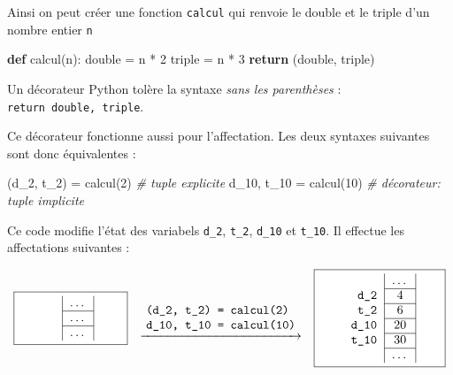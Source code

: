 \documentclass[a4paper,17pt]{extarticle}
\newenvironment{Shaded}{}{}
\newcommand{\KeywordTok}[1]{\textcolor[rgb]{0.00,0.44,0.13}{\textbf{{#1}}}}
\newcommand{\DecValTok}[1]{\textcolor[rgb]{0.25,0.63,0.44}{{#1}}}
\newcommand{\CommentTok}[1]{\textcolor[rgb]{0.38,0.63,0.69}{\textit{{#1}}}}
\newcommand{\NormalTok}[1]{{#1}}
\newcommand{\ControlFlowTok}[1]{\textcolor[rgb]{0.00,0.44,0.13}{\textbf{{#1}}}}
\newcommand{\OperatorTok}[1]{\textcolor[rgb]{0.40,0.40,0.40}{{#1}}}
\begin{document}
\begin{exemple}
    Ainsi on peut créer une fonction \texttt{calcul} qui renvoie le double
et le triple d'un nombre entier \texttt{n}

\begin{Shaded}
\begin{Highlighting}[]
\KeywordTok{def}\NormalTok{ calcul(n):}
\NormalTok{    double }\OperatorTok{=}\NormalTok{ n }\OperatorTok{*} \DecValTok{2}
\NormalTok{    triple }\OperatorTok{=}\NormalTok{ n }\OperatorTok{*} \DecValTok{3}
    \ControlFlowTok{return}\NormalTok{ (double, triple)}
\end{Highlighting}
\end{Shaded}

        \end{exemple}\begin{remarque}
    Un décorateur Python tolère la syntaxe \emph{sans les parenthèses} :
\texttt{return\ double,\ triple}.

Ce décorateur fonctionne aussi pour l'affectation. Les deux syntaxes
suivantes sont donc équivalentes :

\begin{Shaded}
\begin{Highlighting}[]
\NormalTok{(d\_2, t\_2) }\OperatorTok{=}\NormalTok{ calcul(}\DecValTok{2}\NormalTok{)   }\CommentTok{\# tuple explicite}
\NormalTok{d\_10, t\_10 }\OperatorTok{=}\NormalTok{ calcul(}\DecValTok{10}\NormalTok{)  }\CommentTok{\# décorateur: tuple implicite}
\end{Highlighting}
\end{Shaded}

Ce code modifie l'état des variabels \texttt{d\_2}, \texttt{t\_2},
\texttt{d\_10} et \texttt{t\_10}. Il effectue les affectations suivantes
:

\[
\fcolorbox{black}{white}{\parbox{3cm}{\centering
    \begin{tabular}{r|c|}
    & \ldots \\ \cline{2-2}
    & \ldots \\ \cline{2-2}
    & \ldots 
    \end{tabular}
}}
\hfill
\quad\underrightarrow{
    \begin{array}{l}
    \texttt{(d\_2, t\_2) = calcul(2)} \\
    \texttt{d\_10, t\_10 = calcul(10)}\\
    \end{array}
    }\quad
\hfill
\fcolorbox{black}{white}{\parbox{3.5cm}{\centering
    \begin{tabular}{r|c|}
    & \ldots \\ \cline{2-2}
    \texttt{d\_2} & $4$ \\ \cline{2-2}
    \texttt{t\_2} & $6$ \\ \cline{2-2}
    \texttt{d\_10} & $20$ \\ \cline{2-2}
    \texttt{t\_10} & $30$ \\ \cline{2-2}
    & \ldots 
    \end{tabular}
}}
\]

        \end{remarque}
\end{document}
